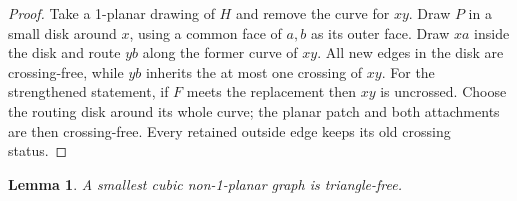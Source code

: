 \documentclass[a4paper,11pt]{article}
\theoremstyle{plain}
\newtheorem{lemma}{Lemma}
\theoremstyle{definition}  %
\begin{document}
\begin{proof}
    Take a 1-planar drawing of $H$ and remove the curve for $xy$.  Draw $P$
    in a small disk around $x$, using a common face of $a,b$ as its outer
    face.  Draw $xa$ inside the disk and route $yb$ along the former curve of
    $xy$.  All new edges in the disk are crossing-free, while $yb$ inherits
    the at most one crossing of $xy$.
    For the strengthened statement, if $F$ meets the replacement then $xy$ is
    uncrossed.  Choose the routing disk around its whole curve; the planar
    patch and both attachments are then crossing-free.  Every retained
    outside edge keeps its old crossing status.
\end{proof}

\begin{lemma}\label{lem:minimal-triangle-free}
    A smallest cubic non-1-planar graph is triangle-free.
\end{lemma}
\end{document}

